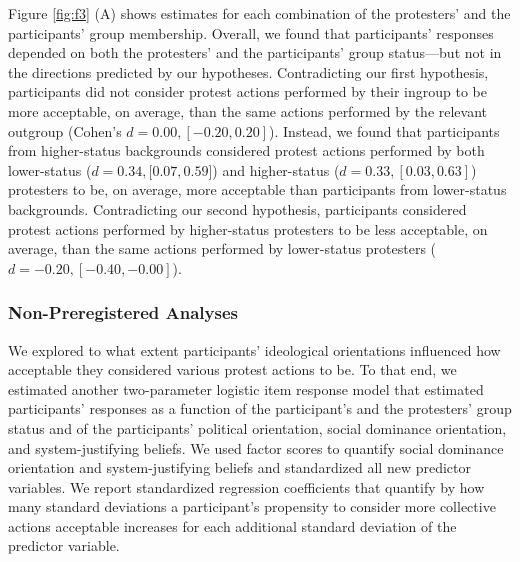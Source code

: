 \documentclass[twocolumn, 11pt, letterpaper]{article}
\begin{document}
Figure \ref{fig:f3} (A) shows estimates for each combination of the
protesters' and the participants' group membership. Overall, we found
that participants' responses depended on both the protesters' and the
participants' group status---but not in the directions predicted by our
hypotheses. Contradicting our first hypothesis, participants did not
consider protest actions performed by their ingroup to be more
acceptable, on average, than the same actions performed by the relevant
outgroup (Cohen's \(d = 0.00, [-0.20, 0.20]\)). Instead, we found that
participants from higher-status backgrounds considered protest actions
performed by both lower-status (\(d = 0.34, [0.07, 0.59\){]}) and
higher-status (\(d = 0.33, [0.03, 0.63]\)) protesters to be, on average,
more acceptable than participants from lower-status backgrounds.
Contradicting our second hypothesis, participants considered protest
actions performed by higher-status protesters to be less acceptable, on
average, than the same actions performed by lower-status protesters
(\(d = -0.20, [-0.40, -0.00]\)).

\hypertarget{non-preregistered-analyses}{%
\subsubsection{Non-Preregistered
Analyses}\label{non-preregistered-analyses}}

We explored to what extent participants' ideological orientations
influenced how acceptable they considered various protest actions to be.
To that end, we estimated another two-parameter logistic item response
model that estimated participants' responses as a function of the
participant's and the protesters' group status and of the participants'
political orientation, social dominance orientation, and
system-justifying beliefs. We used factor scores to quantify social
dominance orientation and system-justifying beliefs and standardized all
new predictor variables. We report standardized regression coefficients
that quantify by how many standard deviations a participant's propensity
to consider more collective actions acceptable increases for each
additional standard deviation of the predictor variable.
\end{document}
